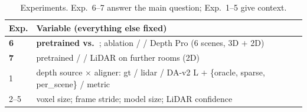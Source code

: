 \begin{table}[t]
\centering\small
\caption{Experiments. Exp.~6--7 answer the main question; Exp.~1--5 give context.}
\label{tab:exps}
\begin{tabularx}{\columnwidth}{@{}lX@{}}
\toprule
Exp. & Variable (everything else fixed) \\
\midrule
\textbf{6} & \textbf{pretrained vs.\ \ftmain{}}; ablation \ftfaro{} / \ftlidar{} / Depth Pro (6 scenes, 3D $+$ 2D) \\
\textbf{7} & pretrained / \ftmain{} / LiDAR on \rsVN{} further rooms (2D) \\
1 & depth source $\times$ aligner: gt / lidar / DA-v2 L $+$ \{oracle, sparse, per\_scene\} / metric \\
2--5 & voxel size; frame stride; model size; LiDAR confidence \\
\bottomrule
\end{tabularx}
\end{table}

